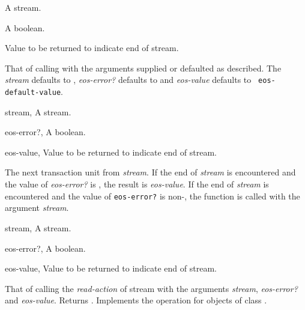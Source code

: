 \begin{optDefinition}
\begin{arguments}
    \item[\optional{stream}] A stream.
    \item[\optional{eos-error?}] A boolean.
    \item[\optional{eos-value}] Value to be returned to indicate end of stream.
\end{arguments}
%
\result%
That of calling  with the arguments supplied or
defaulted as described.
%
\remarks%
The {\em stream\/} defaults to , {\em
    eos-error?\/} defaults to \nil{}\/ and {\em eos-value\/} defaults to {\tt
    eos-default-value}.

\begin{genericargs}
    \item[stream, \classref{stream}] A stream.
    \item[eos-error?, \classref{object}] A boolean.
    \item[eos-value, \classref{object}] Value to be returned to indicate end of
    stream.
\end{genericargs}
%
\result%
The next transaction unit from {\em stream}.
%
\remarks%
If the end of {\em stream\/} is encountered and the value of {\em eos-error?}
is \nil{}, the result is {\em eos-value\/}. If the end of {\em stream} is
encountered and the value of {\tt eos-error?} is non-\nil{}, the function
 is called with the argument {\em stream}.

\begin{specargs}
    \item[stream, \classref{stream}] A stream.
    \item[eos-error?, \classref{object}] A boolean.
    \item[eos-value, \classref{object}] Value to be returned to indicate end of
    stream.
\end{specargs}
%
\result%
That of calling the {\em read-action\/} of stream with the arguments {\em
    stream\/}, {\em eos-error?\/} and {\em eos-value}.  Returns \true.
%
\remarks%
Implements the  operation for objects of class
.


\end{optDefinition}
